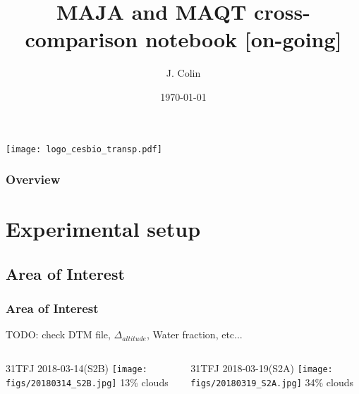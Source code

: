 \documentclass[8pt]{beamer}
\title{MAJA and MAQT cross-comparison notebook [on-going]}
\author{J. Colin\inst{1}}%
\institute{\inst{1}Centre d'\'Etudes Spatiales de la Biosph\`ere, France \url{jerome.colin@cesbio.cnes.fr}\\
}
\date{\today} %
\begin{document}
{
	\begin{frame}
		\vspace{.8cm}
		\texttt{[image: logo\_cesbio\_transp.pdf]}
	\titlepage %
	\end{frame}
}

\begin{frame}
	\frametitle{Overview}
	\tableofcontents
\end{frame}


\section{Experimental setup} 

\subsection{Area of Interest} 

\begin{frame}
\frametitle{Area of Interest}
	
	TODO: check DTM file, $\Delta_{altitude}$, Water fraction, etc...	
	
	\begin{columns}
		\begin{column}{0.5\textwidth}
			\begin{center}
				31TFJ 2018-03-14(S2B)
		     	\texttt{[image: figs/20180314\_S2B.jpg]}
		     	13\% clouds
		    \end{center}		
		\end{column}
		\begin{column}{0.5\textwidth}
			\begin{center}
				31TFJ 2018-03-19(S2A)
		     	\texttt{[image: figs/20180319\_S2A.jpg]}
		     	34\% clouds
		    \end{center}		
		\end{column}
	\end{columns}
\end{frame}
\end{document}
